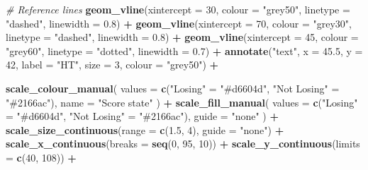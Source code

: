 \documentclass[
]{article}
\newenvironment{Shaded}{\begin{snugshade}}{\end{snugshade}}
\newcommand{\AttributeTok}[1]{\textcolor[rgb]{0.13,0.29,0.53}{#1}}
\newcommand{\CommentTok}[1]{\textcolor[rgb]{0.56,0.35,0.01}{\textit{#1}}}
\newcommand{\DecValTok}[1]{\textcolor[rgb]{0.00,0.00,0.81}{#1}}
\newcommand{\FloatTok}[1]{\textcolor[rgb]{0.00,0.00,0.81}{#1}}
\newcommand{\FunctionTok}[1]{\textcolor[rgb]{0.13,0.29,0.53}{\textbf{#1}}}
\newcommand{\NormalTok}[1]{#1}
\newcommand{\OtherTok}[1]{\textcolor[rgb]{0.56,0.35,0.01}{#1}}
\newcommand{\SpecialCharTok}[1]{\textcolor[rgb]{0.81,0.36,0.00}{\textbf{#1}}}
\newcommand{\StringTok}[1]{\textcolor[rgb]{0.31,0.60,0.02}{#1}}
\begin{document}
\begin{Shaded}
\begin{Highlighting}[]
  \CommentTok{\# Reference lines}
  \FunctionTok{geom\_vline}\NormalTok{(}\AttributeTok{xintercept =} \DecValTok{30}\NormalTok{, }\AttributeTok{colour =} \StringTok{"grey50"}\NormalTok{,}
             \AttributeTok{linetype =} \StringTok{"dashed"}\NormalTok{, }\AttributeTok{linewidth =} \FloatTok{0.8}\NormalTok{) }\SpecialCharTok{+}
  \FunctionTok{geom\_vline}\NormalTok{(}\AttributeTok{xintercept =} \DecValTok{70}\NormalTok{, }\AttributeTok{colour =} \StringTok{"grey30"}\NormalTok{,}
             \AttributeTok{linetype =} \StringTok{"dashed"}\NormalTok{, }\AttributeTok{linewidth =} \FloatTok{0.8}\NormalTok{) }\SpecialCharTok{+}
  \FunctionTok{geom\_vline}\NormalTok{(}\AttributeTok{xintercept =} \DecValTok{45}\NormalTok{, }\AttributeTok{colour =} \StringTok{"grey60"}\NormalTok{,}
             \AttributeTok{linetype =} \StringTok{"dotted"}\NormalTok{, }\AttributeTok{linewidth =} \FloatTok{0.7}\NormalTok{) }\SpecialCharTok{+}
  \FunctionTok{annotate}\NormalTok{(}\StringTok{"text"}\NormalTok{, }\AttributeTok{x =} \FloatTok{45.5}\NormalTok{, }\AttributeTok{y =} \DecValTok{42}\NormalTok{, }\AttributeTok{label =} \StringTok{"HT"}\NormalTok{,}
           \AttributeTok{size =} \DecValTok{3}\NormalTok{, }\AttributeTok{colour =} \StringTok{"grey50"}\NormalTok{) }\SpecialCharTok{+}

  \FunctionTok{scale\_colour\_manual}\NormalTok{(}
    \AttributeTok{values =} \FunctionTok{c}\NormalTok{(}\StringTok{"Losing"} \OtherTok{=} \StringTok{"\#d6604d"}\NormalTok{, }\StringTok{"Not Losing"} \OtherTok{=} \StringTok{"\#2166ac"}\NormalTok{),}
    \AttributeTok{name   =} \StringTok{"Score state"}
\NormalTok{  ) }\SpecialCharTok{+}
  \FunctionTok{scale\_fill\_manual}\NormalTok{(}
    \AttributeTok{values =} \FunctionTok{c}\NormalTok{(}\StringTok{"Losing"} \OtherTok{=} \StringTok{"\#d6604d"}\NormalTok{, }\StringTok{"Not Losing"} \OtherTok{=} \StringTok{"\#2166ac"}\NormalTok{),}
    \AttributeTok{guide  =} \StringTok{"none"}
\NormalTok{  ) }\SpecialCharTok{+}
  \FunctionTok{scale\_size\_continuous}\NormalTok{(}\AttributeTok{range =} \FunctionTok{c}\NormalTok{(}\FloatTok{1.5}\NormalTok{, }\DecValTok{4}\NormalTok{), }\AttributeTok{guide =} \StringTok{"none"}\NormalTok{) }\SpecialCharTok{+}
  \FunctionTok{scale\_x\_continuous}\NormalTok{(}\AttributeTok{breaks =} \FunctionTok{seq}\NormalTok{(}\DecValTok{0}\NormalTok{, }\DecValTok{95}\NormalTok{, }\DecValTok{10}\NormalTok{)) }\SpecialCharTok{+}
  \FunctionTok{scale\_y\_continuous}\NormalTok{(}\AttributeTok{limits =} \FunctionTok{c}\NormalTok{(}\DecValTok{40}\NormalTok{, }\DecValTok{108}\NormalTok{)) }\SpecialCharTok{+}


\end{Highlighting}
\end{Shaded}
\end{document}
